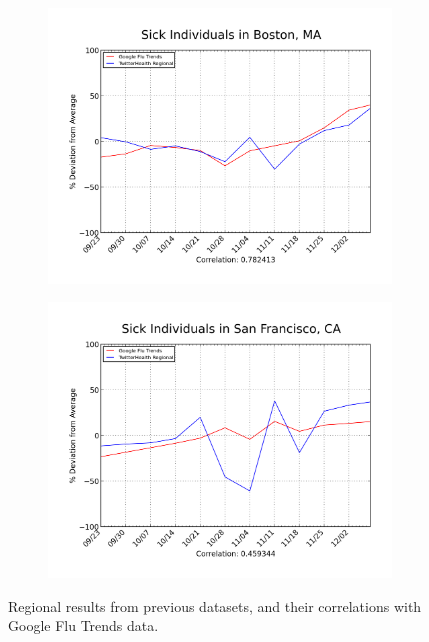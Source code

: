 \documentclass[11pt, letterpaper]{article}
\begin{document}
\begin{figure}[t!]
\begin{center}
\begin{subfigure}[t]{0.45\textwidth}
                    \end{subfigure}
                    \begin{subfigure}[b]{0.45\textwidth}
                        \includegraphics[width=\textwidth]{../plot/figures/BOS_mob_2012-12-15.png}
                    \end{subfigure}
                    \begin{subfigure}[b]{0.45\textwidth}
                        \includegraphics[width=\textwidth]{../plot/figures/SF_mob_2012-12-15.png}
                    \end{subfigure}
                    \caption{Regional results from previous datasets, and their correlations with Google Flu Trends data.}
                    \label{mobile-comparison}
                \end{center}
            \end{figure}
\end{document}

